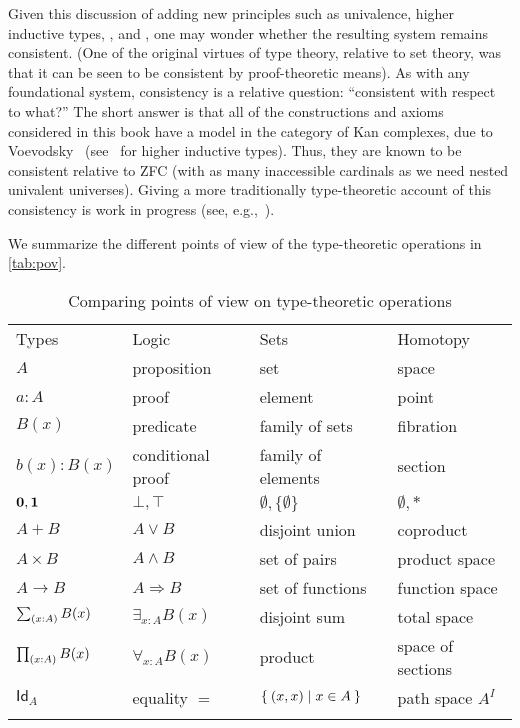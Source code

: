 Given this discussion of adding new principles such as univalence, higher inductive types, \choice{}, and \LEM{}, one may wonder whether the resulting system remains consistent.
(One of the original virtues of type theory, relative to set theory, was that it can be seen to be consistent by proof-theoretic means).
As with any foundational system, consistency is a relative question: ``consistent with respect to what?''
The short answer is that all of the constructions and axioms considered in this book have a model in the category of Kan complexes, due to Voevodsky~\cite{klv:ssetmodel} (see~\cite{ls:hits} for higher inductive types).
Thus, they are known to be consistent relative to ZFC (with as many inaccessible cardinals
%
as we need nested univalent universes).
Giving a more traditionally type-theoretic account of this consistency is work in progress (see,
e.g.,~\cite{lh:canonicity,coquand2012constructive}).

We summarize the different points of view of the type-theoretic operations in \autoref{tab:pov}.

\begin{table}[htb]
  \centering
  \OPTsmalltable
 \begin{tabular}{llll}
    \toprule
       Types & Logic & Sets & Homotopy\\ \addlinespace[2pt]
    \midrule
       $A$ & proposition & set & space\\ \addlinespace[2pt]
       $a:A$ & proof & element & point \\ \addlinespace[2pt]
       $B(x)$ & predicate & family of sets & fibration \\ \addlinespace[2pt]
       $b(x) : B(x)$ & conditional proof & family of elements & section\\ \addlinespace[2pt]
       $\mathbf{0}, \mathbf{1}$ & $\bot, \top$ & $\emptyset, \{ \emptyset \}$ & $\emptyset, *$\\ \addlinespace[2pt]
       $A + B$ & $A\vee B$ & disjoint union & coproduct\\ \addlinespace[2pt]
       $A\times B$ & $A\wedge B$ & set of pairs & product space\\ \addlinespace[2pt]
       $A\to B$ & $A\Rightarrow B$ & set of functions & function space\\ \addlinespace[2pt]
       $\sm{x:A}B(x)$ &  $\exists_{x:A}B(x)$ & disjoint sum & total space\\ \addlinespace[2pt]
       $\prd{x:A}B(x)$ &  $\forall_{x:A}B(x)$ & product & space of sections\\ \addlinespace[2pt]
       $\mathsf{Id}_{A}$ & equality $=$ & $\Set{{\mathopen{}(x,x)\mathclose{}} | x\in A}$ & path space $A^I$ \\ \addlinespace[2pt]
    \bottomrule
  \end{tabular}
  \caption{Comparing points of view on type-theoretic operations}\label{tab:pov}
\end{table}

